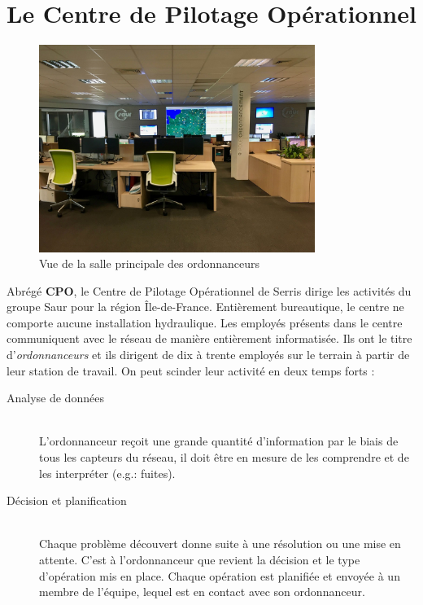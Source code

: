 \documentclass[a4paper, 11pt]{article}
\begin{document}
\section*{Le Centre de Pilotage Opérationnel}
\begin{figure}[H]
    \centering
    \includegraphics[width=0.8\textwidth]{Entretien_Groupe_Saur/saur}
    \caption{Vue de la salle principale des ordonnanceurs}
    \label{visuel}
\end{figure}
Abrégé \textbf{CPO}, le Centre de Pilotage Opérationnel de Serris dirige les activités du groupe Saur pour la région Île-de-France. Entièrement bureautique, le centre ne comporte aucune installation hydraulique. Les employés présents dans le centre communiquent avec le réseau de manière entièrement informatisée. Ils ont le titre d'\textit{ordonnanceurs} et ils dirigent de dix à trente employés sur le terrain à partir de leur station de travail. On peut scinder leur activité en deux temps forts :
\begin{description}
    \item[Analyse de données] \hfill \\
         L'ordonnanceur reçoit une grande quantité d'information par le biais de tous les capteurs du réseau, il doit être en mesure de les comprendre et de les interpréter (e.g.: fuites).
    \item[Décision et planification] \hfill \\
        Chaque problème découvert donne suite à une résolution ou une mise en attente. C'est à l'ordonnanceur que revient la décision et le type d'opération mis en place. Chaque opération est planifiée et envoyée à un membre de l'équipe, lequel est en contact avec son ordonnanceur.
\end{description}
\end{document}
